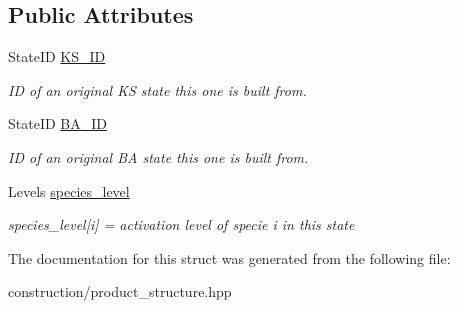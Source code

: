 \subsection*{\-Public \-Attributes}
\begin{DoxyCompactItemize}
\item 
\hypertarget{structProdState_ae3e8c419af83f5f2c1d5eeae9ea1f7d4}{\-State\-I\-D \hyperlink{structProdState_ae3e8c419af83f5f2c1d5eeae9ea1f7d4}{\-K\-S\-\_\-\-I\-D}}\label{structProdState_ae3e8c419af83f5f2c1d5eeae9ea1f7d4}

\begin{DoxyCompactList}\small\item\em \-I\-D of an original \-K\-S state this one is built from. \end{DoxyCompactList}\item 
\hypertarget{structProdState_a6943a6a8d360ed3cc9bfa831259dc668}{\-State\-I\-D \hyperlink{structProdState_a6943a6a8d360ed3cc9bfa831259dc668}{\-B\-A\-\_\-\-I\-D}}\label{structProdState_a6943a6a8d360ed3cc9bfa831259dc668}

\begin{DoxyCompactList}\small\item\em \-I\-D of an original \-B\-A state this one is built from. \end{DoxyCompactList}\item 
\hypertarget{structProdState_ad8d5b69a4dea4a5fe1a3adbf949f38c5}{\-Levels \hyperlink{structProdState_ad8d5b69a4dea4a5fe1a3adbf949f38c5}{species\-\_\-level}}\label{structProdState_ad8d5b69a4dea4a5fe1a3adbf949f38c5}

\begin{DoxyCompactList}\small\item\em species\-\_\-level\mbox{[}i\mbox{]} = activation level of specie i in this state \end{DoxyCompactList}\end{DoxyCompactItemize}


\-The documentation for this struct was generated from the following file\-:\begin{DoxyCompactItemize}
\item 
construction/product\-\_\-structure.\-hpp\end{DoxyCompactItemize}
